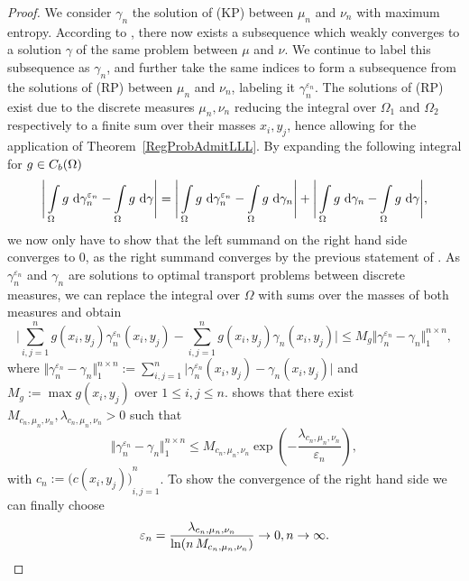 \begin{proof}
	We consider $\gamma_n$ the solution of (KP) between $\mu_n$ and $\nu_n$ with maximum entropy. According to , there now exists a subsequence which weakly converges to a solution $\gamma$ of the same problem between $\mu$ and $\nu$. We continue to label this subsequence as $\gamma_n$, and further take the same indices to form a subsequence from the solutions of (RP) between $\mu_n$ and $\nu_n$, labeling it $\gamma_n^{\varepsilon_n}$. The solutions of (RP) exist due to the discrete measures $\mu_n, \nu_n$ reducing the integral over $\Omega_1$ and $\Omega_2$ respectively to a finite sum over their masses $x_i, y_j$, hence allowing for the application of Theorem~\ref{RegProbAdmitLLL}. By expanding the following integral for $g \in \CF[b]{\Omega}$
	\[ \Bigg\lvert \int\limits_{\Omega} g~\D[\gamma_n^{\varepsilon_n}] - \int\limits_{\Omega} g~\D[\gamma] \Bigg\rvert = \Bigg\lvert \int\limits_{\Omega} g~\D[\gamma_n^{\varepsilon_n}] - \int\limits_{\Omega} g~\D[\gamma_n] \Bigg\rvert + \Bigg\lvert \int\limits_{\Omega} g~\D[\gamma_n] - \int\limits_{\Omega} g~\D[\gamma] \Bigg\rvert, \]
	we now only have to show that the left summand on the right hand side converges to $0$, as the right summand converges by the previous statement of . As $\gamma_n^{\varepsilon_n}$ and $\gamma_n$ are solutions to optimal transport problems between discrete measures, we can replace the integral over $\Omega$ with sums over the masses of both measures and obtain
	\[ \Bigg\lvert \sum\limits_{i, j = 1}^n g(x_i, y_j) \gamma_n^{\varepsilon_n}(x_i, y_j) - \sum\limits_{i, j = 1}^n g(x_i, y_j) \gamma_n(x_i, y_j) \Bigg\rvert \le M_g \Vert \gamma_n^{\varepsilon_n} - \gamma_n \Vert_{1}^{n \times n}, \]
	where $\Vert \gamma_n^{\varepsilon_n} - \gamma_n \Vert_{1}^{n \times n} := \sum\limits_{i, j = 1}^n \big\lvert \gamma_n^{\varepsilon_n}(x_i, y_j) - \gamma_n(x_i, y_j) \big\rvert$ and $M_g := \max g(x_i, y_j)$ over $1 \le i, j \le n$.  shows that there exist $M_{c_n, \mu_n, \nu_n}, \lambda_{c_n, \mu_n, \nu_n} > 0$ such that
	\[ \Vert \gamma_n^{\varepsilon_n} - \gamma_n \Vert_1^{n \times n} \le M_{c_n, \mu_n, \nu_n} \exp\left( -\frac{\lambda_{c_n, \mu_n, \nu_n}}{\varepsilon_n} \right), \]
	with $c_n := {\big( c(x_i, y_j) \big)}_{i, j = 1}^n$. To show the convergence of the right hand side we can finally choose
	\[ \varepsilon_n = \frac{\lambda_{c_n, \mu_n, \nu_n}}{\ln(n\,M_{c_n, \mu_n, \nu_n})} \rightarrow 0, \Ninf. \]
\end{proof}

